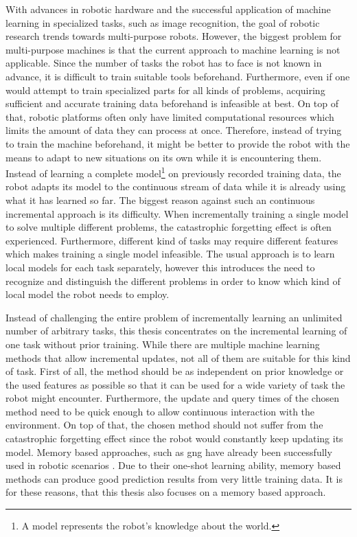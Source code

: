 With advances in robotic hardware and the successful application of machine learning in specialized tasks, such as image recognition, the goal of robotic research trends towards multi-purpose robots. However, the biggest problem for multi-purpose machines is that the current approach to machine learning is not applicable. Since the number of tasks the robot has to face is not known in advance, it is difficult to train suitable tools beforehand. Furthermore, even if one would attempt to train specialized parts for all kinds of problems, acquiring sufficient and accurate training data beforehand is infeasible at best. On top of that, robotic platforms often only have limited computational resources which limits the amount of data they can process at once.
Therefore, instead of trying to train the machine beforehand, it might be better to provide the robot with the means to adapt to new situations on its own while it is encountering them. 
Instead of learning a complete model\footnote{A model represents the robot's knowledge about the world.} on previously recorded training data, the robot adapts its model to the continuous stream of data while it is already using what it has learned so far. 
The biggest reason against such an continuous incremental approach is its difficulty. When incrementally training a single model to solve multiple different problems, the catastrophic forgetting effect is often experienced. Furthermore, different kind of tasks may require different features which makes training a single model infeasible. The usual approach is to learn local models for each task separately, however this introduces the need to recognize and distinguish the different problems in order to know which kind of local model the robot needs to employ.

Instead of challenging the entire problem of incrementally learning an unlimited number of arbitrary tasks, this thesis concentrates on the incremental learning of one task without prior training. 
While there are multiple machine learning methods that allow incremental updates, not all of them are suitable for this kind of task. 
First of all, the method should be as independent on prior knowledge or the used features as possible so that it can be used for a wide variety of task the robot might encounter. Furthermore, the update and query times of the chosen method need to be quick enough to allow continuous interaction with the environment. On top of that, the chosen method should not suffer from the catastrophic forgetting effect since the robot would constantly keep updating its model. Memory based approaches, such as \gls{gng} have already been successfully used in robotic scenarios \cite{carlevarino2000incremental}. Due to their one-shot learning ability, memory based methods can produce good prediction results from very little training data. It is for these reasons, that this thesis also focuses on a memory based approach. 

